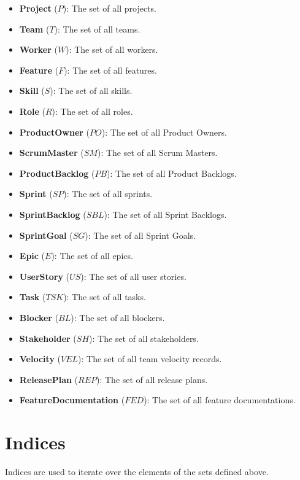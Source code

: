 \documentclass[11pt, a4paper]{article}
\begin{document}
\begin{itemize}
    \item \textbf{Project} ($P$): The set of all projects.
    \item \textbf{Team} ($T$): The set of all teams.
    \item \textbf{Worker} ($W$): The set of all workers.
    \item \textbf{Feature} ($F$): The set of all features.
    \item \textbf{Skill} ($S$): The set of all skills.
    \item \textbf{Role} ($R$): The set of all roles.
    \item \textbf{ProductOwner} ($PO$): The set of all Product Owners.
    \item \textbf{ScrumMaster} ($SM$): The set of all Scrum Masters.
    \item \textbf{ProductBacklog} ($PB$): The set of all Product Backlogs.
    \item \textbf{Sprint} ($SP$): The set of all sprints.
    \item \textbf{SprintBacklog} ($SBL$): The set of all Sprint Backlogs.
    \item \textbf{SprintGoal} ($SG$): The set of all Sprint Goals.
    \item \textbf{Epic} ($E$): The set of all epics.
    \item \textbf{UserStory} ($US$): The set of all user stories.
    \item \textbf{Task} ($TSK$): The set of all tasks.
    \item \textbf{Blocker} ($BL$): The set of all blockers.
    \item \textbf{Stakeholder} ($SH$): The set of all stakeholders.
    \item \textbf{Velocity} ($VEL$): The set of all team velocity records.
    \item \textbf{ReleasePlan} ($REP$): The set of all release plans.
    \item \textbf{FeatureDocumentation} ($FED$): The set of all feature documentations.
\end{itemize}

\section{Indices}
Indices are used to iterate over the elements of the sets defined above.
\end{document}
